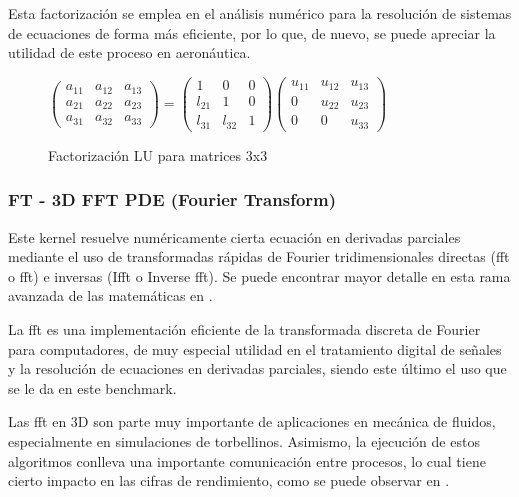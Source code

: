 Esta factorización se emplea en el análisis numérico para la resolución de sistemas de ecuaciones de forma más eficiente, por lo que, de nuevo, se puede apreciar la utilidad de este proceso en aeronáutica.

\begin{figure}[h!]
  \vspace*{0.5cm}
  \centering
  
    $\begin{pmatrix}
    a_{11} & a_{12} & a_{13}\\
    a_{21} & a_{22} & a_{23}\\
    a_{31} & a_{32} & a_{33}
    \end{pmatrix}
    =
    \begin{pmatrix}
    1      & 0      & 0\\
    l_{21} & 1      & 0\\
    l_{31} & l_{32} & 1
    \end{pmatrix}
    \begin{pmatrix}
    u_{11} & u_{12} & u_{13}\\
    0      & u_{22} & u_{23}\\
    0      & 0      & u_{33}
    \end{pmatrix}
    $

  \caption{Factorización LU para matrices 3x3}
  \label{fig:factorizacion_lu}
\end{figure}

\subsubsection{FT - 3D FFT PDE (Fourier Transform)}
Este kernel resuelve numéricamente cierta ecuación en derivadas parciales mediante el uso de transformadas rápidas de Fourier tridimensionales directas (\acrshort{fft} o \acrlong{fft}) e inversas (I\acrshort{fft} o Inverse \acrshort{fft}). Se puede encontrar mayor detalle en esta rama avanzada de las matemáticas en \cite[2.2.4]{benchmarks1994technical}.

La \acrshort{fft} es una implementación eficiente de la transformada discreta de Fourier para computadores, de muy especial utilidad en el tratamiento digital de señales y la resolución de ecuaciones en derivadas parciales, siendo este último el uso que se le da en este benchmark. 

Las \acrshort{fft} en 3D son parte muy importante de aplicaciones en mecánica de fluidos, especialmente en simulaciones de torbellinos. Asimismo, la ejecución de estos algoritmos conlleva una importante comunicación entre procesos, lo cual tiene cierto impacto en las cifras de rendimiento, como se puede observar en .

